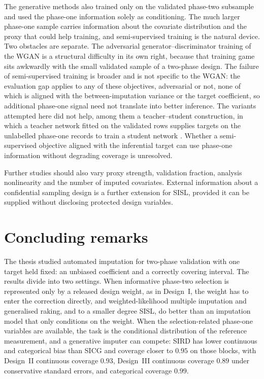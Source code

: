 The generative methods also trained only on the validated phase-two subsample and used the phase-one information solely as conditioning. The much larger phase-one sample carries information about the covariate distribution and the proxy that could help training, and semi-supervised training is the natural device. Two obstacles are separate. The adversarial generator--discriminator training of the WGAN is a structural difficulty in its own right, because that training game sits awkwardly with the small validated sample of a two-phase design. The failure of semi-supervised training is broader and is not specific to the WGAN: the evaluation gap applies to any of these objectives, adversarial or not, none of which is aligned with the between-imputation variance or the target coefficient, so additional phase-one signal need not translate into better inference. The variants attempted here did not help, among them a teacher--student construction, in which a teacher network fitted on the validated rows supplies targets on the unlabelled phase-one records to train a student network \citep{tarvainen2017mean}. Whether a semi-supervised objective aligned with the inferential target can use phase-one information without degrading coverage is unresolved.

Further studies should also vary proxy strength, validation fraction, analysis nonlinearity and the number of imputed covariates. External information about a confidential sampling design is a further extension for SISL, provided it can be supplied without disclosing protected design variables.

\section{Concluding remarks}
\label{sec:conc_final}

The thesis studied automated imputation for two-phase validation with one target held fixed: an unbiased coefficient and a correctly covering interval. The results divide into two settings. When informative phase-two selection is represented only by a released design weight, as in Design~I, the weight has to enter the correction directly, and weighted-likelihood multiple imputation and generalised raking, and to a smaller degree SISL, do better than an imputation model that only conditions on the weight. When the selection-related phase-one variables are available, the task is the conditional distribution of the reference measurement, and a generative imputer can compete: SIRD has lower continuous and categorical bias than SICG and coverage closer to $0.95$ on those blocks, with Design~II continuous coverage $0.93$, Design~III continuous coverage $0.89$ under conservative standard errors, and categorical coverage $0.99$.

